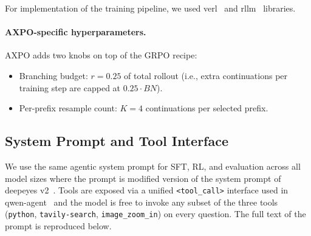 \documentclass{llmxive}
\begin{document}
For implementation of the training pipeline, we used verl~\citep{verl} and rllm~\citep{rllm} libraries.

\paragraph{AXPO-specific hyperparameters.}
AXPO adds two knobs on top of the GRPO recipe:
\begin{itemize}[leftmargin=*, itemsep=2pt]
    \item Branching budget: $r = 0.25$ of total rollout (i.e., extra continuations per training step are capped at $0.25 \cdot BN$).
    \item Per-prefix resample count: $K = 4$ continuations per selected prefix.
\end{itemize}

\subsection{System Prompt and Tool Interface}
\label{app:tools}

We use the same agentic system prompt for SFT, RL, and evaluation across all model sizes where the prompt is modified version of the system prompt of deepeyes v2~\citep{deepeyesv2}.
Tools are exposed via a unified \texttt{<tool\_call>} interface used in qwen-agent~\citep{Qwen3VL} and the model is free to invoke any subset of the three tools (\texttt{python}, \texttt{tavily-search}, \texttt{image\_zoom\_in}) on every question. 
The full text of the prompt is reproduced below.
\end{document}
